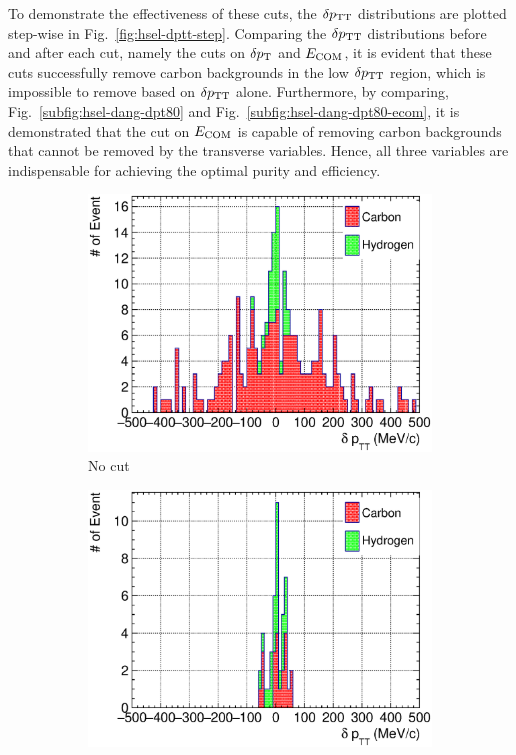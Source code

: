      To demonstrate the effectiveness of these cuts, the $\delta p_\textrm{TT}$ distributions are plotted step-wise in Fig.~\ref{fig:hsel-dptt-step}.
     Comparing the $\delta p_\textrm{TT}$ distributions before and after each cut, namely the cuts on $\delta p_\textrm{T}$ and $E_{\textrm{COM}}$, it is evident that these cuts successfully remove carbon backgrounds in the low $\delta p_\textrm{TT}$ region, which is impossible to remove based on $\delta p_\textrm{TT}$ alone.
     Furthermore, by comparing, Fig.~\ref{subfig:hsel-dang-dpt80} and Fig.~\ref{subfig:hsel-dang-dpt80-ecom}, it is demonstrated that the cut on $E_{\textrm{COM}}$ is capable of removing carbon backgrounds that cannot be removed by the transverse variables.
     Hence, all three variables are indispensable for achieving the optimal purity and efficiency.
     \begin{figure}
     \begin{subfigure}[b]{\trfigwid\textwidth}
          \centering
          \includegraphics[width=\textwidth]{figures/perf/tki/SFGpTPCmu_dptt_stack_al15.eps}
          \caption{No cut}
          \label{subfig:hsel-dang-nocut}
     \end{subfigure}
     \begin{subfigure}[b]{\trfigwid\textwidth}
          \centering
          \includegraphics[width=\textwidth]{figures/perf/tki/SFGpTPCmu_dptt_stack_al15_dpt80.eps}

\end{subfigure}
\end{figure}
